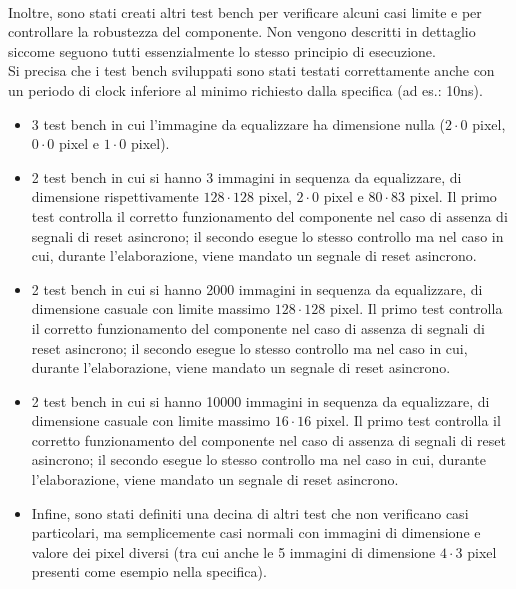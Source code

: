 \documentclass{article}
\begin{document}
\noindent \\ Inoltre, sono stati creati altri test bench per verificare alcuni casi limite e per controllare la robustezza del componente. Non vengono descritti in dettaglio siccome seguono tutti essenzialmente lo stesso principio di esecuzione. \\
Si precisa che i test bench sviluppati sono stati testati correttamente anche con un periodo di clock inferiore al minimo richiesto dalla specifica (ad es.: 10ns).
\vspace{0.2cm}
\begin{itemize}
	\item 3 test bench in cui l'immagine da equalizzare ha dimensione nulla ($2\cdot0$ pixel, $0\cdot0$ pixel e $1\cdot0$ pixel).
	\item 2 test bench in cui si hanno 3 immagini in sequenza da equalizzare, di dimensione rispettivamente $128\cdot128$ pixel, $2\cdot0$ pixel e $80\cdot83$ pixel. Il primo test controlla il corretto funzionamento del componente nel caso di assenza di segnali di reset asincrono; il secondo esegue lo stesso controllo ma nel caso in cui, durante l'elaborazione, viene mandato un segnale di reset asincrono.
	\item 2 test bench in cui si hanno 2000 immagini in sequenza da equalizzare, di dimensione casuale con limite massimo $128\cdot128$ pixel. Il primo test controlla il corretto funzionamento del componente nel caso di assenza di segnali di reset asincrono; il secondo esegue lo stesso controllo ma nel caso in cui, durante l'elaborazione, viene mandato un segnale di reset asincrono.
	\item 2 test bench in cui si hanno 10000 immagini in sequenza da equalizzare, di dimensione casuale con limite massimo $16\cdot16$ pixel. Il primo test controlla il corretto funzionamento del componente nel caso di assenza di segnali di reset asincrono; il secondo esegue lo stesso controllo ma nel caso in cui, durante l'elaborazione, viene mandato un segnale di reset asincrono.
	\item Infine, sono stati definiti una decina di altri test che non verificano casi particolari, ma semplicemente casi normali con immagini di dimensione e valore dei pixel diversi (tra cui anche le 5 immagini di dimensione $4\cdot3$ pixel presenti come esempio nella specifica).
\end{itemize}

\vspace{4mm}
\titlerule[0.4pt]


\end{document}
